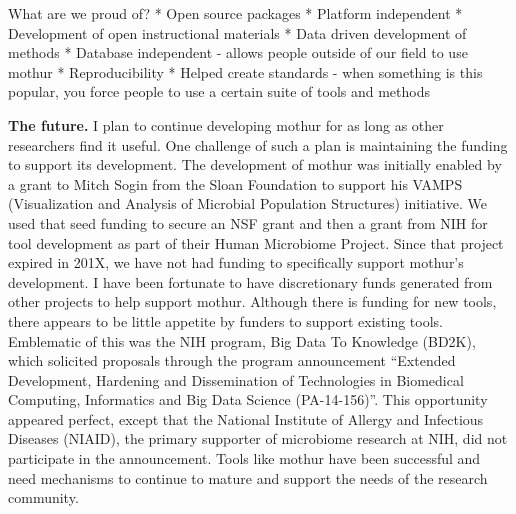 \documentclass[11pt,]{article}
\begin{document}
What are we proud of? * Open source packages * Platform independent *
Development of open instructional materials * Data driven development of
methods * Database independent - allows people outside of our field to
use mothur * Reproducibility * Helped create standards - when something
is this popular, you force people to use a certain suite of tools and
methods

\textbf{The future.} I plan to continue developing mothur for as long as
other researchers find it useful. One challenge of such a plan is
maintaining the funding to support its development. The development of
mothur was initially enabled by a grant to Mitch Sogin from the Sloan
Foundation to support his VAMPS (Visualization and Analysis of Microbial
Population Structures) initiative. We used that seed funding to secure
an NSF grant and then a grant from NIH for tool development as part of
their Human Microbiome Project. Since that project expired in 201X, we
have not had funding to specifically support mothur's development. I
have been fortunate to have discretionary funds generated from other
projects to help support mothur. Although there is funding for new
tools, there appears to be little appetite by funders to support
existing tools. Emblematic of this was the NIH program, Big Data To
Knowledge (BD2K), which solicited proposals through the program
announcement ``Extended Development, Hardening and Dissemination of
Technologies in Biomedical Computing, Informatics and Big Data Science
(PA-14-156)''. This opportunity appeared perfect, except that the
National Institute of Allergy and Infectious Diseases (NIAID), the
primary supporter of microbiome research at NIH, did not participate in
the announcement. Tools like mothur have been successful and need
mechanisms to continue to mature and support the needs of the research
community.
\end{document}
